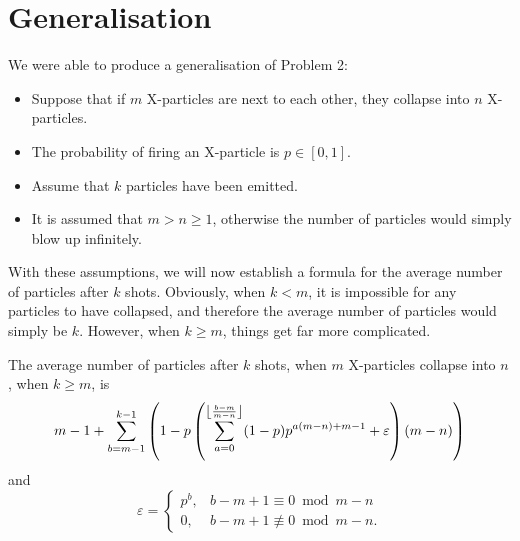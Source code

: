 \section{Generalisation}

We were able to produce a generalisation of Problem 2:
\begin{itemize}
  \item Suppose that if $m$ X-particles are next to each other, they collapse into $n$ X-particles.
  \item The probability of firing an X-particle is $p \in [0, 1]$.
  \item Assume that $k$ particles have been emitted.
  \item It is assumed that $m > n \ge 1$, otherwise the number of particles would simply blow up infinitely.
\end{itemize}
With these assumptions, we will now establish a formula for the average number of particles after $k$ shots. Obviously, when $k < m$, it is impossible for any particles to have collapsed, and therefore the average number of particles would simply be $k$. However, when $k \ge m$, things get far more complicated.
\begin{theorem}
  The average number of particles after $k$ shots, when $m$ X-particles collapse into $n$, when $k \ge m$, is 
  \begin{equation}
    m-1+\sum _{b=m-1}^{k-1} \left(1-p \left(\sum _{a=0}^{\floor*{\frac{b-m}{m-n}} } (1-p) p^{a (m-n)+m-1}+\varepsilon\right) (m-n)\right) \label{formula}
  \end{equation}
  and \[\varepsilon = \begin{cases} p^{b}, &b-m+1 \equiv 0 \bmod m-n \\ 0, &b-m+1 \not\equiv 0 \bmod m-n. \end{cases}\]
\end{theorem}
